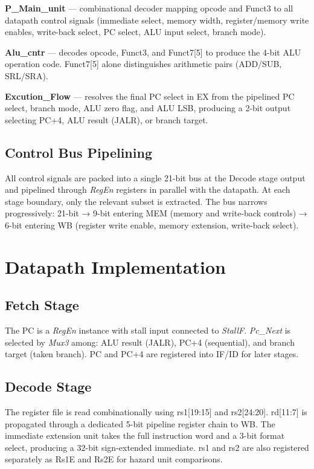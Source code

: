 \textbf{P\_Main\_unit} — combinational decoder mapping opcode and Funct3 to all datapath control signals (immediate select, memory width, register/memory write enables, write-back select, PC select, ALU input select, branch mode).

\textbf{Alu\_cntr} — decodes opcode, Funct3, and Funct7[5] to produce the 4-bit ALU operation code. Funct7[5] alone distinguishes arithmetic pairs (ADD/SUB, SRL/SRA).

\textbf{Excution\_Flow} — resolves the final PC select in EX from the pipelined PC select, branch mode, ALU zero flag, and ALU LSB, producing a 2-bit output selecting PC+4, ALU result (JALR), or branch target.

\subsection{Control Bus Pipelining}
All control signals are packed into a single 21-bit bus at the Decode stage output and pipelined through \textit{RegEn} registers in parallel with the datapath. At each stage boundary, only the relevant subset is extracted. The bus narrows progressively: 21-bit → 9-bit entering MEM (memory and write-back controls) → 6-bit entering WB (register write enable, memory extension, write-back select).

\section{Datapath Implementation}

\subsection{Fetch Stage}
The PC is a \textit{RegEn} instance with stall input connected to \textit{StallF}. \textit{Pc\_Next} is selected by \textit{Mux3} among: ALU result (JALR), PC+4 (sequential), and branch target (taken branch). PC and PC+4 are registered into IF/ID for later stages.

\subsection{Decode Stage}
The register file is read combinationally using rs1[19:15] and rs2[24:20]. rd[11:7] is propagated through a dedicated 5-bit pipeline register chain to WB. The immediate extension unit takes the full instruction word and a 3-bit format select, producing a 32-bit sign-extended immediate. rs1 and rs2 are also registered separately as Rs1E and Rs2E for hazard unit comparisons.

